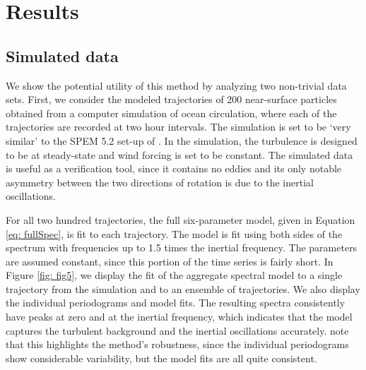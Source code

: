 \documentclass{stat572Style}
\begin{document}
\section{Results}
\subsection{Simulated data}
\par We show the potential utility of this method by analyzing two non-trivial data sets.  
First, we consider the modeled trajectories of 200 near-surface particles obtained from a computer simulation of ocean circulation, where each of the trajectories are recorded at two hour intervals. 
The simulation is set to be `very similar' to the SPEM 5.2 set-up of \citet{Danioux2008}. 
In the  simulation, the turbulence is designed to be at steady-state and wind forcing is set to be  constant. 
The simulated data is useful as a verification tool, since  it contains no eddies and its only  notable asymmetry between the two directions of rotation is due to the inertial oscillations. 


\par For all two hundred trajectories, the full six-parameter model, given in Equation \eqref{eq: fullSpec}, is fit to each trajectory. 
The model is fit using both sides of the spectrum with frequencies up to 1.5 times the inertial frequency. 
The parameters are assumed constant, since this portion of the time series  is fairly short. 
In Figure \ref{fig: fig5}, we display the fit of the aggregate spectral model to a single trajectory from the simulation and to an ensemble of trajectories. 
We also display the individual periodograms and model fits. 
The resulting spectra consistently have peaks at zero and at the inertial frequency, which indicates that the model captures the turbulent background and the inertial oscillations accurately. 
\citet{Sykulski2016}  note that this highlights the method's robustness, since the individual periodograms show considerable variability, but the model fits are all quite consistent.
\end{document}
